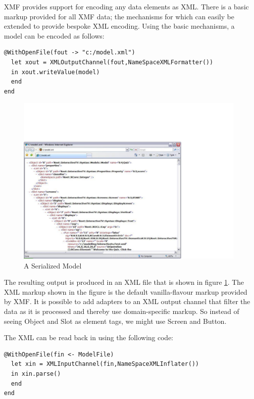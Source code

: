 XMF provides support for encoding any data elements as XML. There
is a basic markup provided for all XMF data; the mechanisms for which
can easily be extended to provide bespoke XML encoding. Using the
basic mechanisms, a model can be encoded as follows:

\begin{lstlisting}
@WithOpenFile(fout -> "c:/model.xml")
  let xout = XMLOutputChannel(fout,NameSpaceXMLFormatter())
  in xout.writeValue(model)
  end
end
\end{lstlisting}%
\begin{figure}
\begin{center}
\includegraphics[scale=0.6]{CaseStudy4/figures/Serialized.pdf}

\caption{A Serialized Model\label{fig:A-Serialized-Model}}
\end{center}
\end{figure}

The resulting output is produced in an XML file that is shown in figure
\ref{fig:A-Serialized-Model}. The XML markup shown in the figure
is the default vanilla-flavour markup provided by XMF. It is possible
to add adapters to an XML output channel that filter the data as it
is processed and thereby use domain-specific markup. So instead of
seeing Object and Slot as element tags, we might use Screen and Button.

The XML can be read back in using the following code:

\begin{lstlisting}
@WithOpenFile(fin <- ModelFile)
  let xin = XMLInputChannel(fin,NameSpaceXMLInflater())
  in xin.parse()
  end
end
\end{lstlisting}
